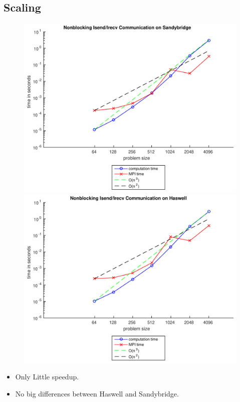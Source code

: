 \documentclass[9pt,pdftex]{beamer}
\begin{document}
\subsection{Scaling}
\begin{frame}{\insertsubsection}
\begin{figure}
\includegraphics[width=.5\textwidth]{Pictures/Task4SB}
\hfill
\includegraphics[width=.5\textwidth]{Pictures/Task4HW}
\end{figure}
\begin{itemize}
\item Only Little speedup.
\item No big differences between Haswell and Sandybridge.
\end{itemize}
\end{frame}
\end{document}
